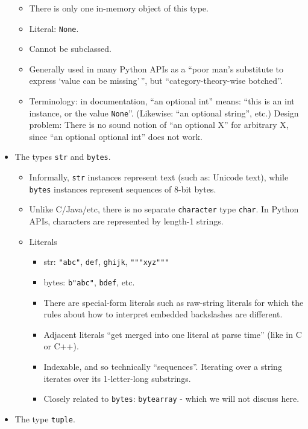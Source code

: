 \documentclass[11pt]{article}
\providecommand{\tightlist}{%
      \setlength{\itemsep}{0pt}\setlength{\parskip}{0pt}}
\begin{document}
\begin{itemize}
  \begin{itemize}
  \tightlist
  \item
    There is only one in-memory object of this type.
  \item
    Literal: \texttt{None}.
  \item
    Cannot be subclassed.
  \item
    Generally used in many Python APIs as a ``poor man's substitute to
    express `value can be missing'\,'', but ``category-theory-wise
    botched''.
  \item
    Terminology: in documentation, ``an optional int'' means: ``this is
    an int instance, or the value \texttt{None}''. (Likewise: ``an
    optional string'', etc.) Design problem: There is no sound notion of
    ``an optional X'' for arbitrary X, since ``an optional optional
    int'' does not work.
  \end{itemize}
\item
  The types \texttt{str} and \texttt{bytes}.

  \begin{itemize}
  \tightlist
  \item
    Informally, \texttt{str} instances represent text (such as: Unicode
    text), while \texttt{bytes} instances represent sequences of 8-bit
    bytes.
  \item
    Unlike C/Java/etc, there is no separate \texttt{character} type
    \texttt{char}. In Python APIs, characters are represented by
    length-1 strings.
  \item
    Literals

    \begin{itemize}
    \tightlist
    \item
      str: \texttt{"abc"},
      \texttt{\textquotesingle{}def\textquotesingle{}},
      \texttt{\textquotesingle{}\textquotesingle{}\textquotesingle{}ghijk\textquotesingle{}\textquotesingle{}\textquotesingle{}},
      \texttt{"""xyz"""}
    \item
      bytes: \texttt{b"abc"},
      \texttt{b\textquotesingle{}def\textquotesingle{}}, etc.
    \item
      There are special-form literals such as raw-string literals for
      which the rules about how to interpret embedded backslashes are
      different.
    \item
      Adjacent literals ``get merged into one literal at parse time''
      (like in C or C++).
    \item
      Indexable, and so technically ``sequences''. Iterating over a
      string iterates over its 1-letter-long substrings.
    \item
      Closely related to \texttt{bytes}: \texttt{bytearray} - which we
      will not discuss here.
    \end{itemize}
  \end{itemize}
\item
  The type \texttt{tuple}.


\end{itemize}
\end{document}
